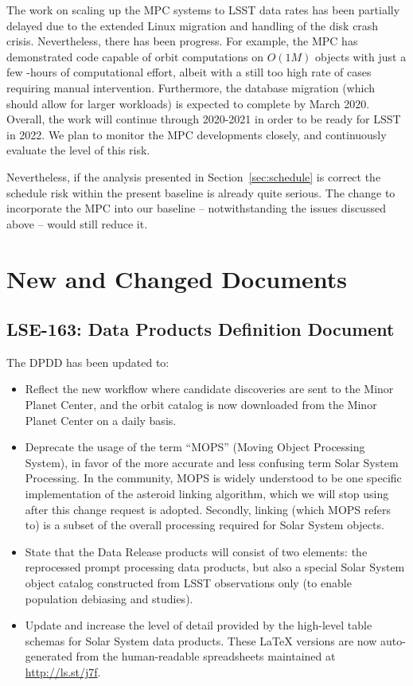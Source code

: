 \documentclass[DM,authoryear,toc,lsstdraft]{lsstdoc}
\begin{document}
The work on scaling up the MPC systems to LSST data rates has been partially delayed due to the extended Linux migration and handling of the disk crash crisis. Nevertheless, there has been progress. For example, the MPC has demonstrated code capable of orbit computations on $O(1M)$ objects with just a few -hours of computational effort, albeit with a still too high rate of cases requiring manual intervention. Furthermore, the database migration (which should allow for larger workloads) is expected to complete by March 2020. Overall, the work will continue through 2020-2021 in order to be ready for LSST in 2022. We plan to monitor the MPC developments closely, and continuously evaluate the level of this risk.

Nevertheless, if the analysis presented in Section~\ref{sec:schedule} is correct the schedule risk within the present baseline is already quite serious. The change to incorporate the MPC into our baseline -- notwithstanding the issues discussed above -- would still reduce it.

\section{New and Changed Documents}

\subsection{LSE-163: Data Products Definition Document}

The DPDD has been updated to:
\begin{itemize}
\item Reflect the new workflow where candidate discoveries are sent to the Minor Planet Center, and the orbit catalog is now downloaded from the Minor Planet Center on a daily basis.
\item Deprecate the usage of the term ``MOPS'' (Moving Object Processing System), in favor of the more accurate and less confusing term Solar System Processing. In the community, MOPS is widely understood to be one specific implementation of the asteroid linking algorithm, which we will stop using after this change request is adopted. Secondly, linking (which MOPS refers to) is a subset of the overall processing required for Solar System objects.
\item State that the Data Release products will consist of two elements: the reprocessed prompt processing data products, but also a special Solar System object catalog constructed from LSST observations only (to enable population debiasing and studies).
\item Update and increase the level of detail provided by the high-level table schemas for Solar System data products. These \LaTeX{} versions are now auto-generated from the human-readable spreadsheets maintained at \url{http://ls.st/j7f}.
\end{itemize}
\end{document}
